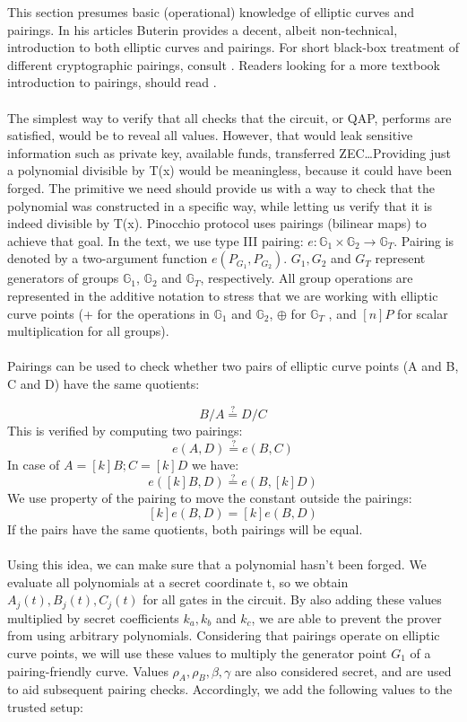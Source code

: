 This section presumes basic (operational) knowledge of elliptic curves and pairings. In his articles Buterin provides a decent, albeit non-technical, introduction to both elliptic curves and pairings\cite{buterin1, buterin2, buterin3}. For short black-box treatment of different cryptographic pairings, consult \cite{galbraith2008pairings}. Readers looking for a more textbook introduction to pairings, should read \cite{costello2012pairings}.\\
\\
The simplest way to verify that all checks that the circuit, or QAP, performs are satisfied, would be to reveal all values. However, that would leak sensitive information such as private key, available funds, transferred ZEC\dots Providing just a polynomial divisible by T(x) would be meaningless, because it could have been forged. The primitive we need should provide us with a way to check that the polynomial was constructed in a specific way, while letting us verify that it is indeed divisible by T(x). Pinocchio protocol uses  pairings (bilinear maps) to achieve that goal. In the text, we use type III pairing: $e: \mathbb{G}_1 \times \mathbb{G}_2 \to \mathbb{G}_T$. Pairing is denoted by a two-argument function $e(P_{G_1}, P_{G_2})$. $G_1, G_2$ and $G_T$ represent generators of groups $\mathbb{G}_1$, $\mathbb{G}_2$ and $\mathbb{G}_T$, respectively. All group operations are represented in the additive notation to stress that we are working with elliptic curve points (+ for the operations in $\mathbb{G}_1$ and $\mathbb{G}_2$, $\oplus$ for $\mathbb{G}_T$ , and $[n]P$ for scalar multiplication for all groups).\\
\\
Pairings can be used to check whether two pairs of elliptic curve points (A and B, C and D) have the same quotients:

$$ B / A \stackrel{?}{=} D / C $$
This is verified by computing two pairings:
$$ e(A, D) \stackrel{?}{=} e(B, C) $$
In case of $A = [k]B; C = [k]D$ we have:
$$ e([k]B, D) \stackrel{?}{=} e(B, [k]D)$$
We use property of the pairing to move the constant outside the pairings:
$$ [k]e(B, D) = [k]e(B, D) $$
If the pairs have the same quotients, both pairings will be equal.\\
\\
Using this idea, we can make sure that a polynomial hasn't been forged. We evaluate all polynomials at a secret coordinate t, so we obtain $A_j(t), B_j(t), C_j(t)$ for all gates in the circuit. By also adding these values multiplied by secret coefficients $k_a, k_b$ and $k_c$, we are able to prevent the prover from using arbitrary polynomials. Considering that pairings operate on elliptic curve points, we will use these values to multiply the generator point $G_1$ of a pairing-friendly curve. Values $\rho_A, \rho_B, \beta, \gamma$ are also considered secret, and are used to aid subsequent pairing checks. Accordingly, we add the following values to the trusted setup:

